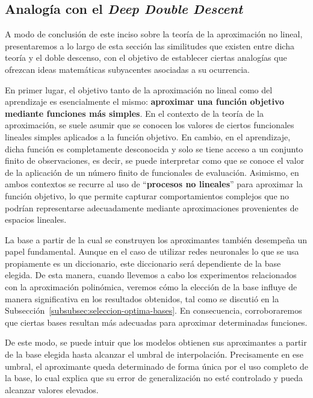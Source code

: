 \subsection{Analogía con el \textit{Deep Double Descent}}\label{subsec:analogia-matematica-ddd}

A modo de conclusión de este inciso sobre la teoría de la aproximación no lineal, presentaremos a lo largo de esta sección las similitudes que existen entre dicha teoría y el doble descenso, con el objetivo de establecer ciertas analogías que ofrezcan ideas matemáticas subyacentes asociadas a su ocurrencia.

En primer lugar, el objetivo tanto de la aproximación no lineal como del aprendizaje es esencialmente el mismo: \textbf{aproximar una función objetivo mediante funciones más simples}. En el contexto de la teoría de la aproximación, se suele asumir que se conocen los valores de ciertos funcionales lineales simples aplicados a la función objetivo. En cambio, en el aprendizaje, dicha función es completamente desconocida y solo se tiene acceso a un conjunto finito de observaciones, es decir, se puede interpretar como que se conoce el valor de la aplicación de un número finito de funcionales de evaluación. Asimismo, en ambos contextos se recurre al uso de ``\textbf{procesos no lineales}'' para aproximar la función objetivo, lo que permite capturar comportamientos complejos que no podrían representarse adecuadamente mediante aproximaciones provenientes de espacios lineales.

La base a partir de la cual se construyen los aproximantes también desempeña un papel fundamental. Aunque en el caso de utilizar redes neuronales lo que se usa propiamente es un diccionario, este diccionario será dependiente de la base elegida. De esta manera, cuando llevemos a cabo los experimentos relacionados con la aproximación polinómica, veremos cómo la elección de la base influye de manera significativa en los resultados obtenidos, tal como se discutió en la Subsección~\ref{subsubsec:seleccion-optima-bases}. En consecuencia, corroboraremos que ciertas bases resultan más adecuadas para aproximar determinadas funciones. 

De este modo, se puede intuir que los modelos obtienen sus aproximantes a partir de la base elegida hasta alcanzar el umbral de interpolación. Precisamente en ese umbral, el aproximante queda determinado de forma única por el uso completo de la base, lo cual explica que su error de generalización no esté controlado y pueda alcanzar valores elevados.

